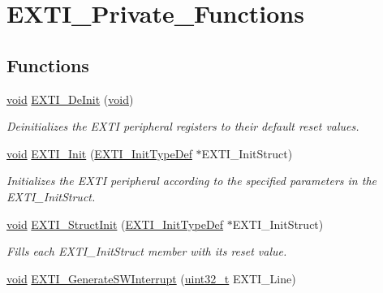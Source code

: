 \hypertarget{group___e_x_t_i___private___functions}{}\section{E\+X\+T\+I\+\_\+\+Private\+\_\+\+Functions}
\label{group___e_x_t_i___private___functions}
\subsection*{Functions}
\begin{DoxyCompactItemize}
\item 
\hyperlink{usb__devapi_8h_afabf60e7f57651d6d595a02c75f07cd0}{void} \hyperlink{group___e_x_t_i___private___functions_ga07072e339cb9ecb9cd9d4b94afc9f317}{E\+X\+T\+I\+\_\+\+De\+Init} (\hyperlink{usb__devapi_8h_afabf60e7f57651d6d595a02c75f07cd0}{void})
\begin{DoxyCompactList}\small\item\em Deinitializes the E\+X\+TI peripheral registers to their default reset values. \end{DoxyCompactList}\item 
\hyperlink{usb__devapi_8h_afabf60e7f57651d6d595a02c75f07cd0}{void} \hyperlink{group___e_x_t_i___private___functions_ga8c9ce6352a3a2dfc8fc9287cb24c6501}{E\+X\+T\+I\+\_\+\+Init} (\hyperlink{struct_e_x_t_i___init_type_def}{E\+X\+T\+I\+\_\+\+Init\+Type\+Def} $\ast$E\+X\+T\+I\+\_\+\+Init\+Struct)
\begin{DoxyCompactList}\small\item\em Initializes the E\+X\+TI peripheral according to the specified parameters in the E\+X\+T\+I\+\_\+\+Init\+Struct. \end{DoxyCompactList}\item 
\hyperlink{usb__devapi_8h_afabf60e7f57651d6d595a02c75f07cd0}{void} \hyperlink{group___e_x_t_i___private___functions_ga86b9e662d18a2f829999cfb26aa7ca20}{E\+X\+T\+I\+\_\+\+Struct\+Init} (\hyperlink{struct_e_x_t_i___init_type_def}{E\+X\+T\+I\+\_\+\+Init\+Type\+Def} $\ast$E\+X\+T\+I\+\_\+\+Init\+Struct)
\begin{DoxyCompactList}\small\item\em Fills each E\+X\+T\+I\+\_\+\+Init\+Struct member with its reset value. \end{DoxyCompactList}\item 
\hyperlink{usb__devapi_8h_afabf60e7f57651d6d595a02c75f07cd0}{void} \hyperlink{group___e_x_t_i___private___functions_ga897e8ea59f40a19e047fb9994876fc9b}{E\+X\+T\+I\+\_\+\+Generate\+S\+W\+Interrupt} (\hyperlink{_p_e___types_8h_a33594304e786b158f3fb30289278f5af}{uint32\+\_\+t} E\+X\+T\+I\+\_\+\+Line)

\end{DoxyCompactItemize}
